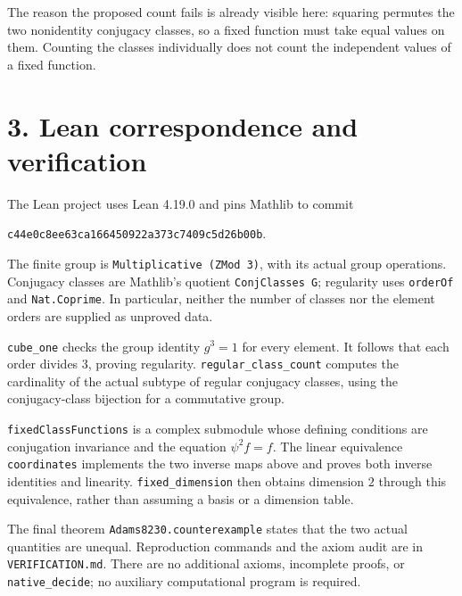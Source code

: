 \documentclass[11pt,a4paper]{article}
\begin{document}
The reason the proposed count fails is already visible here: squaring
permutes the two nonidentity conjugacy classes, so a fixed function must
take equal values on them. Counting the classes individually does not
count the independent values of a fixed function.

\section*{3. Lean correspondence and verification}
The Lean project uses Lean 4.19.0 and pins Mathlib to commit
\begin{center}\small
\texttt{c44e0c8ee63ca166450922a373c7409c5d26b00b}.
\end{center}
The finite group is \texttt{Multiplicative (ZMod 3)}, with its actual
group operations. Conjugacy classes are Mathlib's quotient
\texttt{ConjClasses G}; regularity uses \texttt{orderOf} and
\texttt{Nat.Coprime}. In particular, neither the number of classes nor
the element orders are supplied as unproved data.

\texttt{cube\_one} checks the group identity $g^3=1$ for every element.
It follows that each order divides $3$, proving regularity.
\texttt{regular\_class\_count} computes the cardinality of the actual
subtype of regular conjugacy classes, using the conjugacy-class
bijection for a commutative group.

\texttt{fixedClassFunctions} is a complex submodule whose defining
conditions are conjugation invariance and the equation $\psi^2f=f$.
The linear equivalence \texttt{coordinates} implements the two inverse
maps above and proves both inverse identities and linearity.
\texttt{fixed\_dimension} then obtains dimension $2$ through this
equivalence, rather than assuming a basis or a dimension table.

The final theorem \texttt{Adams8230.counterexample} states that the two
actual quantities are unequal. Reproduction commands and the axiom audit
are in \texttt{VERIFICATION.md}. There are no additional axioms,
incomplete proofs, or \texttt{native\_decide}; no auxiliary computational
program is required.
\end{document}
